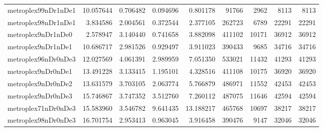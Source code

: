 \documentclass[../../../thesis.tex]{subfiles}
\begin{document}
\begin{longtable}{|l|r|r|r|r|r|r|r|r|}
metroplex99nDr1nDe1 & 10.057644 & 0.706482 & 0.094696 & 0.801178 & 91766 & 2962 & 8113 & 8113 \\
metroplex98nDr1nDe1 & 3.834586 & 2.004561 & 0.372544 & 2.377105 & 262723 & 6789 & 22291 & 22291 \\
metroplex9nDr1nDe0 & 2.578947 & 3.140440 & 0.741658 & 3.882098 & 411102 & 10171 & 36912 & 36912 \\
metroplex9nDr1nDe1 & 10.686717 & 2.981526 & 0.929497 & 3.911023 & 390433 & 9685 & 34716 & 34716 \\
metroplex96nDr0nDe3 & 12.027569 & 4.061391 & 2.989959 & 7.051350 & 533021 & 11432 & 41293 & 41293 \\
metroplex9nDr0nDe1 & 13.491228 & 3.133415 & 1.195101 & 4.328516 & 411108 & 10175 & 36920 & 36920 \\
metroplex9nDr0nDe2 & 13.631579 & 3.703105 & 2.063774 & 5.766879 & 486971 & 11552 & 42453 & 42453 \\
metroplex9nDr0nDe3 & 15.746867 & 3.747352 & 3.512760 & 7.260112 & 487075 & 11646 & 42594 & 42594 \\
metroplex71nDr0nDe3 & 15.583960 & 3.546782 & 9.641435 & 13.188217 & 465768 & 10697 & 38217 & 38217 \\
metroplex98nDr0nDe3 & 16.701754 & 2.953413 & 0.963045 & 3.916458 & 390476 & 9147 & 32046 & 32046 \\
\end{longtable}
\end{document}
